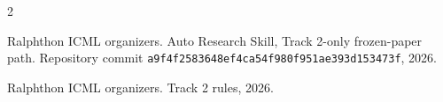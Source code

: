 \documentclass[11pt,a4paper]{article}
\begin{document}
\begin{thebibliography}{2}

Ralphthon ICML organizers.
\newblock Auto Research Skill, Track 2-only frozen-paper path.
\newblock Repository commit
\nolinkurl{a9f4f2583648ef4ca54f980f951ae393d153473f}, 2026.

Ralphthon ICML organizers.
\newblock Track 2 rules, 2026.

\end{thebibliography}
\end{document}

